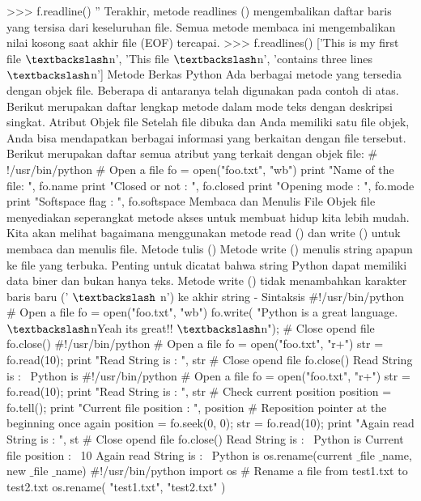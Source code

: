 >>> f.readline()
''  
Terakhir, metode readlines () mengembalikan daftar baris yang tersisa dari keseluruhan file. Semua metode membaca ini mengembalikan nilai kosong saat akhir file (EOF) tercapai. 
>>> f.readlines() 
['This is my first file $  \textbackslash  $n', 'This file $  \textbackslash  $n', 'contains three lines $  \textbackslash  $n']
Metode Berkas Python
Ada berbagai metode yang tersedia dengan objek file. Beberapa di antaranya telah digunakan pada contoh di atas. 
Berikut merupakan daftar lengkap metode dalam mode teks dengan deskripsi singkat. 
Atribut Objek file
Setelah file dibuka dan Anda memiliki satu file objek, Anda bisa mendapatkan berbagai informasi yang berkaitan dengan file tersebut. 
Berikut merupakan daftar semua atribut yang terkait dengan objek file:
 $  \#  $!/usr/bin/python 
 $  \#  $ Open a file 
fo = open("foo.txt", "wb") 
print "Name of the file: ", fo.name 
print "Closed or not : ", fo.closed 
print "Opening mode : ", fo.mode 
print "Softspace flag : ", fo.softspace 
Membaca dan Menulis File  
Objek file menyediakan seperangkat metode akses untuk membuat hidup kita lebih mudah. Kita akan melihat bagaimana menggunakan metode read () dan write () untuk membaca dan menulis file. 
Metode tulis ()
Metode write () menulis string apapun ke file yang terbuka. Penting untuk dicatat bahwa string Python dapat memiliki data biner dan bukan hanya teks. 
Metode write () tidak menambahkan karakter baris baru (' $  \textbackslash  $ n') ke akhir string -
Sintaksis 
 $  \#  $!/usr/bin/python
\noindent 
 $  \#  $ Open a file 
fo = open("foo.txt", "wb") 
fo.write( "Python is a great language. $  \textbackslash  $nYeah its great!! $  \textbackslash  $n"); 
 $  \#  $ Close opend file 
fo.close() 
 $  \#  $!/usr/bin/python
 $  \#  $ Open a file
fo = open("foo.txt", "r+") 
str = fo.read(10); 
print "Read String is : ", str 
 $  \#  $ Close opend file 
fo.close() 
Read String is :~ Python is
 $  \#  $!/usr/bin/python 
 $  \#  $ Open a file 
fo = open("foo.txt", "r+")
str = fo.read(10); 
print "Read String is : ", str 
 $  \#  $ Check current position
position = fo.tell();
print "Current file position : ", position
 $  \#  $ Reposition pointer at the beginning once again
position = fo.seek(0, 0);
str = fo.read(10);
print "Again read String is : ", st
 $  \#  $ Close opend file
fo.close()
Read String is :~ Python is 
Current file position :~ 10
Again read String is :~ Python is
os.rename(current $  \_  $file $  \_  $name, new $  \_  $file $  \_  $name) 
 $  \#  $!/usr/bin/python
import os 
 $  \#  $ Rename a file from test1.txt to test2.txt 
os.rename( "test1.txt", "test2.txt" ) 
